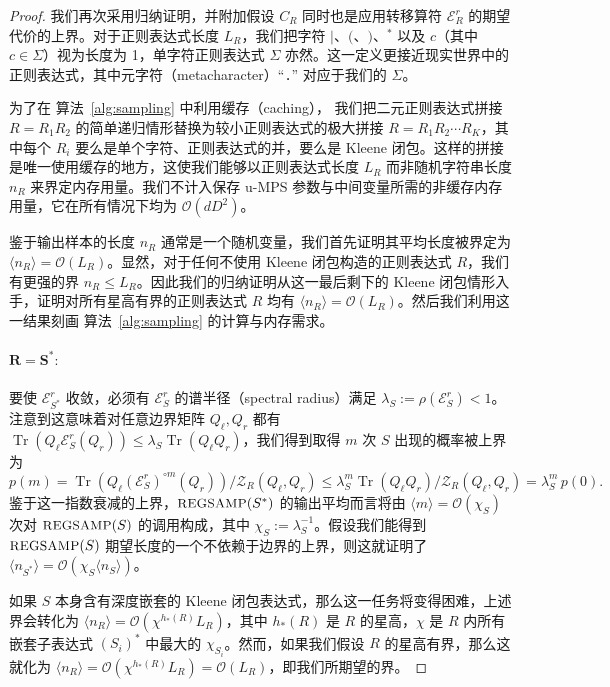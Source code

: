 \documentclass[twoside]{article}
\newcommand{\Sample}{\textsc{\small REGSAMP}}
\DeclareMathOperator{\Tr}{Tr}
\newcommand{\bigO}{\mc{O}}
\newcommand{\ER}{\mc{E}^{\scriptstyle r}}
\newcommand{\QL}{Q_{\ell}}
\newcommand{\QR}{Q_{r}}
\newcommand{\mc}[1]{\mathcal{#1}}
\begin{document}
\begin{proof}

我们再次采用归纳证明，并附加假设 $C_R$ 同时也是应用转移算符 $\ER_R$ 的期望代价的上界。对于正则表达式长度 $L_R$，我们把字符 $|$、$($、$)$、$^*$ 以及 $c$（其中 $c \in \Sigma$）视为长度为 1，单字符正则表达式 $\Sigma$ 亦然。这一定义更接近现实世界中的正则表达式，其中元字符（metacharacter）``\texttt{.}'' 对应于我们的 $\Sigma$。

为了在 算法~\ref{alg:sampling} 中利用缓存（caching），
我们把二元正则表达式拼接 $R = R_1 R_2$ 的简单递归情形替换为较小正则表达式的极大拼接 $R = R_1 R_2 \cdots R_K$，其中每个 $R_i$ 要么是单个字符、正则表达式的并，要么是 Kleene 闭包。这样的拼接是唯一使用缓存的地方，这使我们能够以正则表达式长度 $L_R$ 而非随机字符串长度 $n_R$ 来界定内存用量。我们不计入保存 u-MPS 参数与中间变量所需的非缓存内存用量，它在所有情况下均为 $\bigO(d D^2)$。

鉴于输出样本的长度 $n_R$ 通常是一个随机变量，我们首先证明其平均长度被界定为 $\langle n_R \rangle = \bigO(L_R)$。显然，对于任何不使用 Kleene 闭包构造的正则表达式 $R$，我们有更强的界 $n_R \leq L_R$。因此我们的归纳证明从这一最后剩下的 Kleene 闭包情形入手，证明对所有星高有界的正则表达式 $R$ 均有 $\langle n_R \rangle = \bigO(L_R)$。然后我们利用这一结果刻画 算法~\ref{alg:sampling} 的计算与内存需求。

\paragraph{$\mathbf{R = S^*:}$} 要使 $\ER_{S^*}$ 收敛，必须有 $\ER_S$ 的谱半径（spectral radius）满足 $\lambda_S := \rho(\ER_S) < 1$。注意到这意味着对任意边界矩阵 $\QL, \QR$ 都有 $\Tr(\QL \ER_S(\QR)) \leq \lambda_S \Tr(\QL \QR)$，我们得到取得 $m$ 次 $S$ 出现的概率被上界为
%
\begin{equation*}
p(m) = \Tr(\QL (\ER_S)^{\circ m}(\QR)) / \mc{Z}_R(\QL, \QR) \leq \lambda_S^m \Tr(\QL \QR) / \mc{Z}_R(\QL, \QR) = \lambda_S^m\, p(0).
\end{equation*}
%
鉴于这一指数衰减的上界，$\Sample(S^*)$ 的输出平均而言将由 $\langle m \rangle = \bigO(\chi_S)$ 次对 $\Sample(S)$ 的调用构成，其中 $\chi_S := \lambda_S^{-1}$。假设我们能得到 $\Sample(S)$ 期望长度的一个不依赖于边界的上界，则这就证明了 $\langle n_{S^*} \rangle = \bigO(\chi_S \langle n_S \rangle)$。

如果 $S$ 本身含有深度嵌套的 Kleene 闭包表达式，那么这一任务将变得困难，上述界会转化为 $\langle n_R \rangle = \bigO(\chi^{h_*(R)} L_R)$，其中 $h_*(R)$ 是 $R$ 的星高，$\chi$ 是 $R$ 内所有嵌套子表达式 $(S_i)^*$ 中最大的 $\chi_{S_i}$。然而，如果我们假设 $R$ 的星高有界，那么这就化为 $\langle n_R \rangle = \bigO(\chi^{h_*(R)} L_R) = \bigO(L_R)$，即我们所期望的界。


\end{proof}
\end{document}
